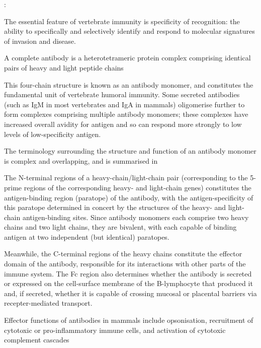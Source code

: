 \citep{mix2006immunoglobulins}:

The essential feature  of vertebrate immunity is specificity of recognition: the ability to specifically and selectively identify and respond to molecular signatures of invasion and disease. %

A complete antibody is a heterotetrameric protein complex comprising identical pairs of heavy and light peptide chains %

This four-chain structure is known as an antibody monomer, and constitutes the fundamental unit of vertebrate humoral immunity. Some secreted antibodies (such as IgM in most vertebrates and IgA in mammals) oligomerise further to form complexes comprising multiple antibody monomers; these complexes have increased overall avidity for antigen and so can respond more strongly to low levels of low-specificity antigen. %

The terminology surrounding the structure and function of an antibody monomer is complex and overlapping, and is summarised in %

The N-terminal regions of a heavy-chain/light-chain pair (corresponding to the 5-prime regions of the corresponding heavy- and light-chain genes) constitutes the antigen-binding region (paratope) of the antibody, with the antigen-specificity of this paratope determined in concert by the structures of the heavy- and light-chain antigen-binding sites. Since antibody monomers each comprise two heavy chains and two light chains, they are bivalent, with each capable of binding antigen at two independent (but identical) paratopes. %

Meanwhile, the C-terminal regions of the heavy chains constitute the effector domain of the antibody, responsible for its interactions with other parts of the immune system. The Fc region also determines whether the antibody is secreted or expressed on the cell-surface membrane of the B-lymphocyte that produced it and, if secreted, whether it is capable of crossing mucosal or placental barriers via recepter-mediated transport. 

Effector functions of antibodies in mammals include opsonisation, recruitment of cytotoxic or pro-inflammatory immune cells, and activation of cytotoxic complement cascades%

